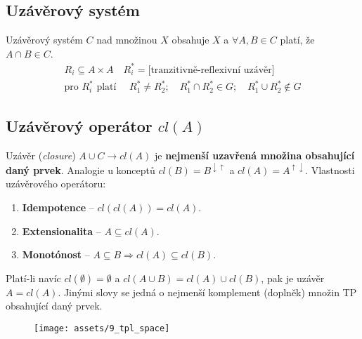\subsection{Uzávěrový systém}
Uzávěrový systém $C$ nad množinou $X$ obsahuje $X$ a $\forall A, B \in C$ platí, že $A \cap B \in C$.
\begin{equation*}
    \begin{aligned}
        R_i \subseteq A \times A \quad R_i^* = \textrm{[tranzitivně-reflexivní uzávěr]} \\
        \textrm{pro } R_i^* \textrm{ platí } \quad R_1^* \neq R_2^*; \quad R_1^* \cap R_2^* \in G;\quad R_1^* \cup R_2^* \notin G
    \end{aligned}
\end{equation*}

\subsection{Uzávěrový operátor $cl(A)$}
Uzávěr (\textit{closure}) $A \cup C \rightarrow cl(A)$ je \textbf{nejmenší uzavřená množina obsahující daný prvek}. Analogie u konceptů $cl(B) = B^{\downarrow\uparrow}$ a $cl(A) = A^{\uparrow\downarrow}$. Vlastnosti uzávěrového operátoru:
\begin{enumerate}
    \item \textbf{Idempotence} -- $cl(cl(A)) = cl(A)$.
    \item \textbf{Extensionalita} -- $A \subseteq cl(A)$.
    \item \textbf{Monotónost} -- $A \subseteq B \Rightarrow cl(A) \subseteq cl(B)$.
\end{enumerate}

Platí-li navíc $cl(\emptyset) = \emptyset$ a $cl(A \cup B) = cl(A) \cup cl(B)$, pak je uzávěr $A = cl(A)$. Jinými slovy se jedná o nejmenší komplement (doplněk) množin TP obsahující daný prvek.
\\
\begin{figure}[H]
    \centering
    \texttt{[image: assets/9\_tpl\_space]}
\end{figure}


